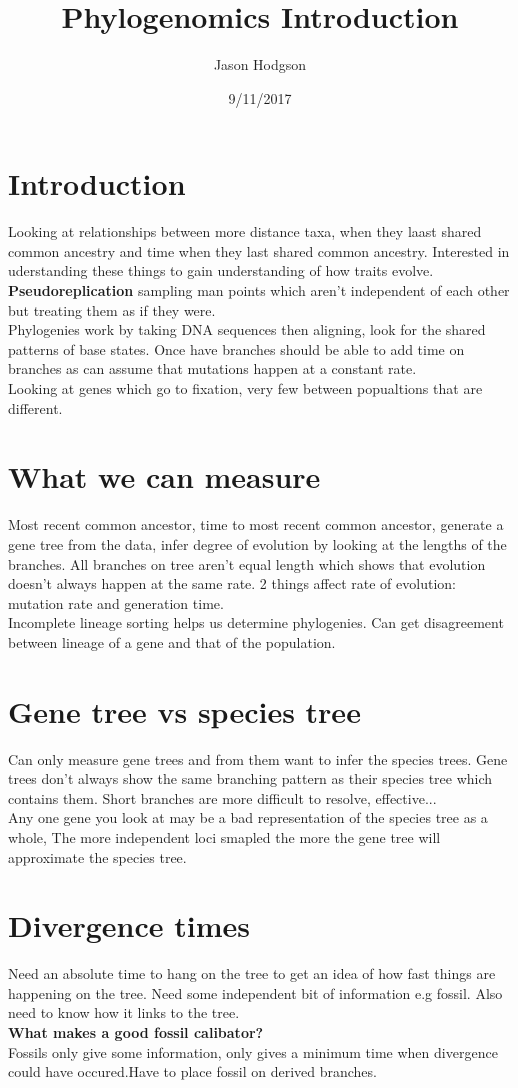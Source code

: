 \documentclass[11pt]{article}
\title{Phylogenomics Introduction}
\author{Jason Hodgson}
\date{9/11/2017}
\begin{document}
\maketitle
\section{Introduction}
Looking at relationships between more distance taxa, when they laast shared common ancestry and time when they last shared common ancestry. Interested in uderstanding these things to gain understanding of how traits evolve.\\
{\bf Pseudoreplication} sampling man points which aren't independent of each other but treating them as if they were.\\
Phylogenies work by taking DNA sequences then aligning, look for the shared patterns  of base states. Once have branches should be able to add time on branches as can assume that mutations happen at a constant rate. \\
Looking at genes which go to fixation, very few between popualtions that are different.
\section{What we can measure}
Most recent common ancestor, time to most recent common ancestor, generate a gene tree from the data, infer degree of evolution by looking at the lengths of the branches. All branches on tree aren't equal length which shows that evolution doesn't always happen at the same rate. 2 things affect rate of evolution: mutation rate and generation time. \\
Incomplete lineage sorting helps us determine phylogenies. Can get disagreement between lineage of a gene and that of the population. 
\section{Gene tree vs species tree}
Can only measure gene trees and from them want to infer the species trees. Gene trees don't always show the same branching pattern as their species tree which contains them. Short branches are more difficult to resolve, effective... \\
Any one gene you look at may be a bad representation of the species tree as a whole, The more independent loci smapled the more the gene tree will approximate the species tree.
\section{Divergence times}
Need an absolute time to hang on the tree to get an idea of how fast things are happening on the tree. Need some independent bit of information e.g fossil. Also need to know how it links to the tree.\\
{\bf What makes a good fossil calibator?}\\
Fossils only give some information, only gives a  minimum time when divergence could have occured.Have to place fossil on derived branches.  
\end{document}
